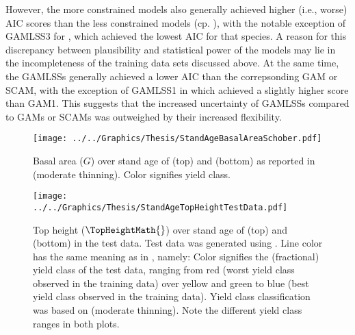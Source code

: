 However, the more constrained models also generally achieved higher (i.e., worse) AIC scores than the less constrained models (cp. ), with the notable exception of GAMLSS3 for \Spruce{}, which achieved the lowest AIC for that species.  A reason for this discrepancy between plausibility and statistical power of the models may lie in the incompleteness of the training data sets discussed above.  At the same time, the GAMLSSs generally achieved a lower AIC than the correpsonding GAM or SCAM, with the exception of GAMLSS1 in \Spruce{} which achieved a slightly higher score than GAM1.  This suggests that the increased uncertainty of GAMLSSs compared to GAMs or SCAMs was outweighed by their increased flexibility.

\begin{figure}[h]
  \centering
  \texttt{[image: ../../Graphics/Thesis/StandAgeBasalAreaSchober.pdf]}
  \caption{Basal area (\(G\)) over stand age of \Beech{} (top) and \Spruce{} (bottom) as reported in \textcite{Schober1995} (moderate thinning).  Color signifies yield class.}
  \label{fig:StandAgeBasalAreaSchober}
\end{figure}

\begin{figure}[h]
  \centering
  \texttt{[image: ../../Graphics/Thesis/StandAgeTopHeightTestData.pdf]}
  \caption{Top height (\(\TopHeightMath{}\)) over stand age of \Beech{} (top) and \Spruce{} (bottom) in the test data.  Test data was generated using .  Line color has the same meaning as in , namely:  Color signifies the (fractional) yield class of the test data, ranging from red (worst yield class observed in the training data) over yellow and green to blue (best yield class observed in the training data).  Yield class classification was based on \textcite{Schober1995} (moderate thinning).  Note the different yield class ranges in both plots.}
  \label{fig:StandAgeTopHeightTestData}
\end{figure}

\clearpage{}


